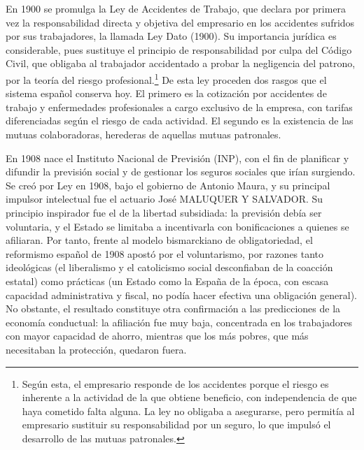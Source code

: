 \documentclass[10pt,a4paper]{article}
\begin{document}
En 1900 se promulga la Ley de Accidentes de Trabajo, que declara por primera vez la responsabilidad directa y objetiva del empresario en los accidentes sufridos por sus trabajadores, la llamada Ley Dato (1900). Su importancia jurídica es considerable, pues sustituye el principio de responsabilidad por culpa del Código Civil, que obligaba al trabajador accidentado a probar la negligencia del patrono, por la teoría del riesgo profesional.\footnote{%
    Según esta, el empresario responde de los accidentes porque el riesgo es inherente a la actividad de la que obtiene beneficio, con independencia de que haya cometido falta alguna. La ley no obligaba a asegurarse, pero permitía al empresario sustituir su responsabilidad por un seguro, lo que impulsó el desarrollo de las mutuas patronales.
} De esta ley proceden dos rasgos que el sistema español conserva hoy. El primero es la cotización por accidentes de trabajo y enfermedades profesionales a cargo exclusivo de la empresa, con tarifas diferenciadas según el riesgo de cada actividad. El segundo es la existencia de las mutuas colaboradoras, herederas de aquellas mutuas patronales.

En 1908 nace el Instituto Nacional de Previsión (INP), con el fin de planificar y difundir la previsión social y de gestionar los seguros sociales que irían surgiendo. Se creó por Ley en 1908, bajo el gobierno de Antonio Maura, y su principal impulsor intelectual fue el actuario José MALUQUER Y SALVADOR. Su principio inspirador fue el de la libertad subsidiada: la previsión debía ser voluntaria, y el Estado se limitaba a incentivarla con bonificaciones a quienes se afiliaran. Por tanto, frente al modelo bismarckiano de obligatoriedad, el reformismo español de 1908 apostó por el voluntarismo, por razones tanto ideológicas (el liberalismo y el catolicismo social desconfiaban de la coacción estatal) como prácticas (un Estado como la España de la época, con escasa capacidad administrativa y fiscal, no podía hacer efectiva una obligación general). No obstante, el resultado constituye otra confirmación a las predicciones de la economía conductual: la afiliación fue muy baja, concentrada en los trabajadores con mayor capacidad de ahorro, mientras que los más pobres, que más necesitaban la protección, quedaron fuera. 
\end{document}
